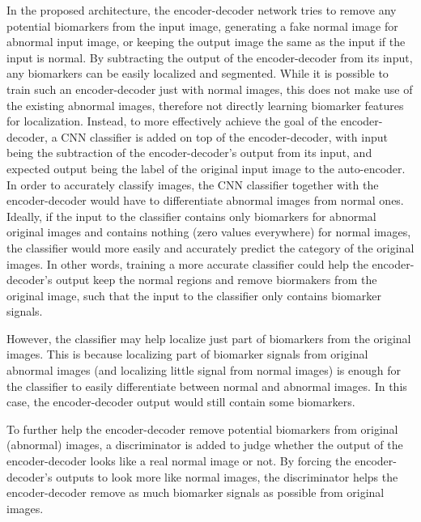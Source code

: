 \documentclass[runningheads]{llncs}
\begin{document}
In the proposed architecture, the encoder-decoder network tries to remove any potential biomarkers from the input image, generating a fake normal image for abnormal input image, or keeping the output image the same as the input if the input is normal. By subtracting the output of the encoder-decoder from its input, any biomarkers can be easily localized and segmented. While it is possible to train such an encoder-decoder just with normal images, this does not make use of the existing abnormal images, therefore not directly learning biomarker features for localization. Instead, to more effectively achieve the goal of the encoder-decoder, a CNN classifier is added on top of the encoder-decoder, with input being the subtraction of the encoder-decoder's output from its input, and expected output being the label of the original input image to the auto-encoder. In order to accurately classify images, the CNN classifier together with the encoder-decoder would have to differentiate abnormal images from normal ones. Ideally, if the input to the classifier contains only biomarkers for abnormal original images and contains nothing (zero values everywhere) for normal images, the classifier would more easily and accurately predict the category of the original images. In other words, training a more accurate classifier could help the encoder-decoder's output keep the normal regions and remove biormakers from the original image, such that the input to the classifier only contains biomarker signals.

However, the classifier may help localize just part of biomarkers from the original images. This is because localizing part of biomarker signals from original abnormal images (and localizing little signal from normal images) is enough for the classifier to easily differentiate between normal and abnormal images. In this case, the encoder-decoder output would still contain some biomarkers.

To further help the encoder-decoder remove potential biomarkers from original (abnormal) images, a discriminator is added to judge whether the output of the encoder-decoder looks like a real normal image or not. By forcing the encoder-decoder's outputs to look more like normal images, the discriminator helps the encoder-decoder remove as much biomarker signals as possible from original images. 
\end{document}
